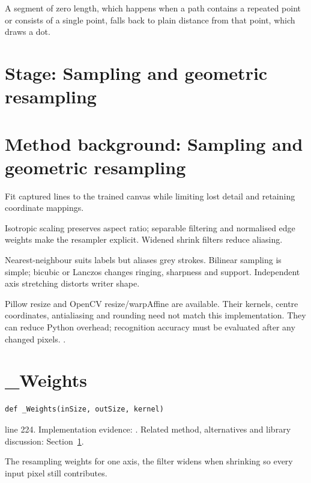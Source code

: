 A segment of zero length, which happens when a path contains a repeated point or consists of a single point, falls back to plain distance from that point, which draws a dot.



\section*{Stage: Sampling and geometric resampling}
\section{Method background: Sampling and geometric resampling}\label{method:resize}
Fit captured lines to the trained canvas while limiting lost detail and retaining coordinate mappings.


Isotropic scaling preserves aspect ratio; separable filtering and normalised edge weights make the resampler explicit. Widened shrink filters reduce aliasing.


Nearest-neighbour suits labels but aliases grey strokes. Bilinear sampling is simple; bicubic or Lanczos changes ringing, sharpness and support. Independent axis stretching distorts writer shape.


Pillow resize and OpenCV resize/warpAffine are available. Their kernels, centre coordinates, antialiasing and rounding need not match this implementation. They can reduce Python overhead; recognition accuracy must be evaluated after any changed pixels. \cite{wolberg1990,pillowimage,opencvtransform}.


\section{\_Weights}\label{fn:segment:-Weights}
\begin{lstlisting}[style=sig]
def _Weights(inSize, outSize, kernel)
\end{lstlisting}
 line 224. Implementation evidence: \cite{code2026}. Related method, alternatives and library discussion: Section~\ref{method:resize}.


The resampling weights for one axis, the filter widens when shrinking so every input pixel still contributes.




